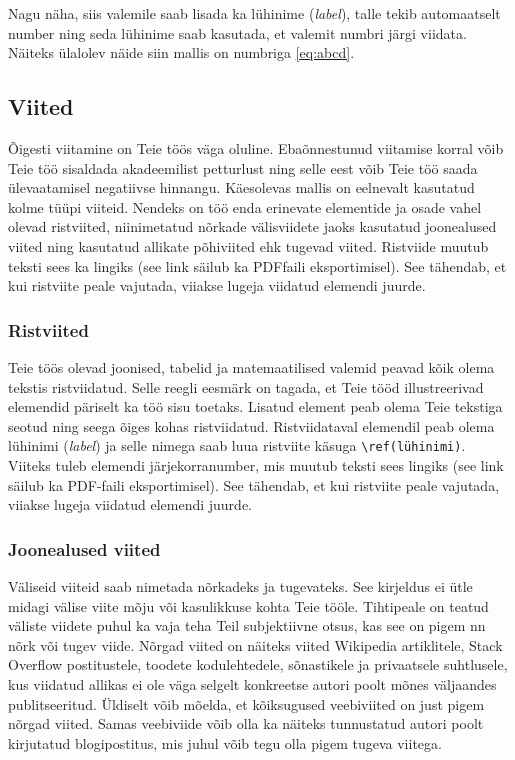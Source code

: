 Nagu näha, siis valemile saab lisada ka lühinime (\emph{label}), talle tekib automaatselt number ning seda lühinime saab kasutada, et valemit numbri järgi viidata. Näiteks ülalolev näide siin mallis on numbriga \ref{eq:abcd}.

\subsection{Viited}
Õigesti viitamine on Teie töös väga oluline. Ebaõnnestunud viitamise korral võib Teie töö sisaldada akadeemilist petturlust ning selle eest võib Teie töö saada ülevaatamisel negatiivse hinnangu. Käesolevas mallis on eelnevalt kasutatud kolme tüüpi viiteid. Nendeks on töö enda erinevate elementide ja osade vahel olevad ristviited, niinimetatud nõrkade välisviidete jaoks kasutatud joonealused viited ning kasutatud allikate põhiviited ehk tugevad viited. Ristviide muutub teksti sees ka lingiks (see link säilub ka PDF{}faili eksportimisel). See tähendab, et kui ristviite peale vajutada, viiakse lugeja viidatud elemendi juurde.

\subsubsection{Ristviited}
Teie töös olevad joonised, tabelid ja matemaatilised valemid peavad kõik olema tekstis ristviidatud. Selle reegli eesmärk on tagada, et Teie tööd illustreerivad elemendid päriselt ka töö sisu toetaks. Lisatud element peab olema Teie tekstiga seotud ning seega õiges kohas ristviidatud. Ristviidataval elemendil peab olema lühinimi (\emph{label}) ja selle nimega saab luua ristviite käsuga \verb|\ref(lühinimi)|. Viiteks tuleb elemendi järjekorranumber, mis muutub teksti sees lingiks (see link säilub ka PDF-faili eksportimisel). See tähendab, et kui ristviite peale vajutada, viiakse lugeja viidatud elemendi juurde.

\subsubsection{Joonealused viited}
Väliseid viiteid saab nimetada nõrkadeks ja tugevateks. See kirjeldus ei ütle midagi välise viite mõju või kasulikkuse kohta Teie tööle. Tihtipeale on teatud väliste viidete puhul ka vaja teha Teil subjektiivne otsus, kas see on pigem nn nõrk või tugev viide. Nõrgad viited on näiteks viited Wikipedia artiklitele, Stack Overflow postitustele, toodete kodulehtedele, sõnastikele ja privaatsele suhtlusele, kus viidatud allikas ei ole väga selgelt konkreetse autori poolt mõnes väljaandes publitseeritud. Üldiselt võib mõelda, et kõiksugused veebiviited on just pigem nõrgad viited. Samas veebiviide võib olla ka näiteks tunnustatud autori poolt kirjutatud blogipostitus, mis juhul võib tegu olla pigem tugeva viitega.


